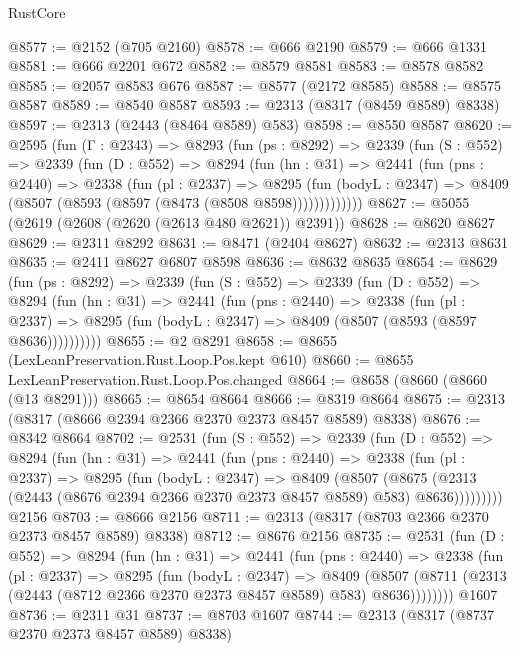 \begin{lexlean}{RustCore}
\begin{coremodule}
@8577 := @2152 (@705 @2160)
@8578 := @666 @2190
@8579 := @666 @1331
@8581 := @666 @2201 @672
@8582 := @8579 @8581
@8583 := @8578 @8582
@8585 := @2057 @8583 @676
@8587 := @8577 (@2172 @8585)
@8588 := @8575 @8587
@8589 := @8540 @8587
@8593 := @2313 (@8317 (@8459 @8589) @8338)
@8597 := @2313 (@2443 (@8464 @8589) @583)
@8598 := @8550 @8587
@8620 := @2595
    (fun (Γ : @2343) =>
    @8293
      (fun (ps : @8292) =>
      @2339
        (fun (S : @552) =>
        @2339
          (fun (D : @552) =>
          @8294
            (fun (hn : @31) =>
            @2441
              (fun (pns : @2440) =>
              @2338
                (fun (pl : @2337) =>
                @8295
                  (fun (bodyL : @2347) =>
                  @8409 (@8507 (@8593 (@8597 (@8473 (@8508 @8598)))))))))))))
@8627 := @5055 (@2619 (@2608 (@2620 (@2613 @480 @2621)) @2391))
@8628 := @8620 @8627
@8629 := @2311 @8292
@8631 := @8471 (@2404 @8627)
@8632 := @2313 @8631
@8635 := @2411 @8627 @6807 @8598
@8636 := @8632 @8635
@8654 := @8629
    (fun (ps : @8292) =>
    @2339
      (fun (S : @552) =>
      @2339
        (fun (D : @552) =>
        @8294
          (fun (hn : @31) =>
          @2441
            (fun (pns : @2440) =>
            @2338
              (fun (pl : @2337) =>
              @8295 (fun (bodyL : @2347) => @8409 (@8507 (@8593 (@8597 @8636))))))))))
@8655 := @2 @8291
@8658 := @8655 (LexLeanPreservation.Rust.Loop.Pos.kept @610)
@8660 := @8655 LexLeanPreservation.Rust.Loop.Pos.changed
@8664 := @8658 (@8660 (@8660 (@13 @8291)))
@8665 := @8654 @8664
@8666 := @8319 @8664
@8675 := @2313 (@8317 (@8666 @2394 @2366 @2370 @2373 @8457 @8589) @8338)
@8676 := @8342 @8664
@8702 := @2531
    (fun (S : @552) =>
    @2339
      (fun (D : @552) =>
      @8294
        (fun (hn : @31) =>
        @2441
          (fun (pns : @2440) =>
          @2338
            (fun (pl : @2337) =>
            @8295
              (fun (bodyL : @2347) =>
              @8409
                (@8507
                  (@8675
                    (@2313 (@2443 (@8676 @2394 @2366 @2370 @2373 @8457 @8589) @583) @8636)))))))))
    @2156
@8703 := @8666 @2156
@8711 := @2313 (@8317 (@8703 @2366 @2370 @2373 @8457 @8589) @8338)
@8712 := @8676 @2156
@8735 := @2531
    (fun (D : @552) =>
    @8294
      (fun (hn : @31) =>
      @2441
        (fun (pns : @2440) =>
        @2338
          (fun (pl : @2337) =>
          @8295
            (fun (bodyL : @2347) =>
            @8409
              (@8507 (@8711 (@2313 (@2443 (@8712 @2366 @2370 @2373 @8457 @8589) @583) @8636))))))))
    @1607
@8736 := @2311 @31
@8737 := @8703 @1607
@8744 := @2313 (@8317 (@8737 @2370 @2373 @8457 @8589) @8338)

\end{coremodule}
\end{lexlean}
